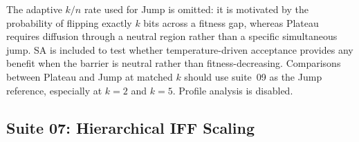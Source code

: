 The adaptive $k/n$ rate used for Jump is omitted: it is motivated by the
probability of flipping exactly $k$ bits across a fitness gap, whereas Plateau
requires diffusion through a neutral region rather than a specific simultaneous
jump. SA is included to test whether temperature-driven acceptance provides any
benefit when the barrier is neutral rather than fitness-decreasing. Comparisons
between Plateau and Jump at matched $k$ should use suite~09 as the Jump
reference, especially at $k=2$ and $k=5$. Profile analysis is disabled.

\subsection{Suite 07: Hierarchical IFF Scaling}





